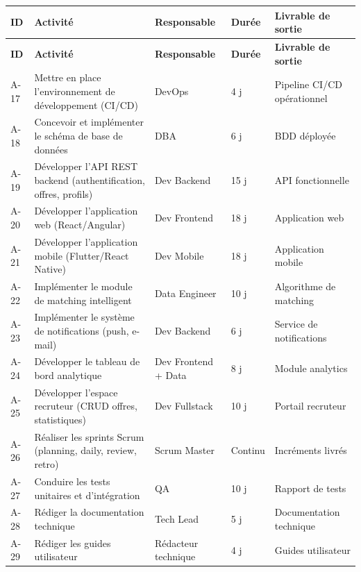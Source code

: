 \documentclass[11pt,a4paper]{article}
\begin{document}
\begin{longtable}{|p{1.2cm}|p{5.5cm}|p{2.2cm}|p{2cm}|p{2.5cm}|}
    \hline
    \rowcolor{ifrigray}
    \textbf{ID} & \textbf{Activité} & \textbf{Responsable} & \textbf{Durée} & \textbf{Livrable de sortie} \\
    \hline
    \endfirsthead
    \hline
    \rowcolor{ifrigray}
    \textbf{ID} & \textbf{Activité} & \textbf{Responsable} & \textbf{Durée} & \textbf{Livrable de sortie} \\
    \hline
    \endhead

    A-17 & Mettre en place l'environnement de développement (CI/CD) & DevOps & 4 j & Pipeline CI/CD opérationnel \\
    \hline
    A-18 & Concevoir et implémenter le schéma de base de données & DBA & 6 j & BDD déployée \\
    \hline
    A-19 & Développer l'API REST backend (authentification, offres, profils) & Dev Backend & 15 j & API fonctionnelle \\
    \hline
    A-20 & Développer l'application web (React/Angular) & Dev Frontend & 18 j & Application web \\
    \hline
    A-21 & Développer l'application mobile (Flutter/React Native) & Dev Mobile & 18 j & Application mobile \\
    \hline
    A-22 & Implémenter le module de matching intelligent & Data Engineer & 10 j & Algorithme de matching \\
    \hline
    A-23 & Implémenter le système de notifications (push, e-mail) & Dev Backend & 6 j & Service de notifications \\
    \hline
    A-24 & Développer le tableau de bord analytique & Dev Frontend + Data & 8 j & Module analytics \\
    \hline
    A-25 & Développer l'espace recruteur (CRUD offres, statistiques) & Dev Fullstack & 10 j & Portail recruteur \\
    \hline
    A-26 & Réaliser les sprints Scrum (planning, daily, review, retro) & Scrum Master & Continu & Incréments livrés \\
    \hline
    A-27 & Conduire les tests unitaires et d'intégration & QA & 10 j & Rapport de tests \\
    \hline
    A-28 & Rédiger la documentation technique & Tech Lead & 5 j & Documentation technique \\
    \hline
    A-29 & Rédiger les guides utilisateur & Rédacteur technique & 4 j & Guides utilisateur \\
    \hline
\end{longtable}
\end{document}
